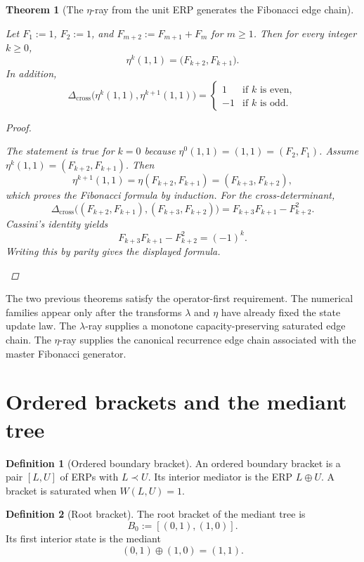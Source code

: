 \documentclass[11pt, letterpaper]{article}
\newcommand{\lop}{\lambda}
\newcommand{\aop}{\eta}
\newcommand{\med}{\oplus}
\newcommand{\Dcross}{\Delta_{\mathrm{cross}}}
\theoremstyle{definition}
\newtheorem{definition}{Definition}[section]
\theoremstyle{plain}
\newtheorem{theorem}{Theorem}[section]
\begin{document}
\begin{theorem}[The $\aop$-ray from the unit ERP generates the Fibonacci edge chain]
\begin{rsbox}
Let $F_1:=1$, $F_2:=1$, and $F_{m+2}:=F_{m+1}+F_m$ for $m\geq 1$.  Then for
every integer $k\geq 0$,
\[
\aop^{k}(1,1)=\bigl(F_{k+2},F_{k+1}\bigr).
\]
In addition,
\[
\Dcross\!\bigl(\aop^{k}(1,1),\aop^{k+1}(1,1)\bigr)
=
\begin{cases}
1 & \text{if }k\text{ is even},\\
-1 & \text{if }k\text{ is odd}.
\end{cases}
\]
\end{rsbox}
\begin{proof}
\begin{rsbox}
The statement is true for $k=0$ because $\aop^0(1,1)=(1,1)=(F_2,F_1)$.  Assume
$\aop^k(1,1)=(F_{k+2},F_{k+1})$.  Then
\[
\aop^{k+1}(1,1)=\aop(F_{k+2},F_{k+1})
=(F_{k+3},F_{k+2}),
\]
which proves the Fibonacci formula by induction.  For the cross-determinant,
\[
\Dcross\!\bigl((F_{k+2},F_{k+1}),(F_{k+3},F_{k+2})\bigr)
=
F_{k+3}F_{k+1}-F_{k+2}^2.
\]
Cassini's identity yields
\[
F_{k+3}F_{k+1}-F_{k+2}^2=(-1)^k.
\]
Writing this by parity gives the displayed formula.
\end{rsbox}
\end{proof}

\end{theorem}

\begin{observebox}
The two previous theorems satisfy the operator-first requirement.  The
numerical families appear only after the transforms $\lop$ and $\aop$ have
already fixed the state update law.  The $\lop$-ray supplies a monotone
capacity-preserving saturated edge chain.  The $\aop$-ray supplies the canonical
recurrence edge chain associated with the master Fibonacci generator.
\end{observebox}

\section{Ordered brackets and the mediant tree}

\begin{definition}[Ordered boundary bracket]
An ordered boundary bracket is a pair $[L,U]$ of ERPs with $L\prec U$.  Its
interior mediator is the ERP $L\med U$.  A bracket is saturated when
$W(L,U)=1$.
\end{definition}

\begin{definition}[Root bracket]
The root bracket of the mediant tree is
\[
B_0:=[(0,1),(1,0)].
\]
Its first interior state is the mediant
\[
(0,1)\med(1,0)=(1,1).
\]
\end{definition}
\end{document}
